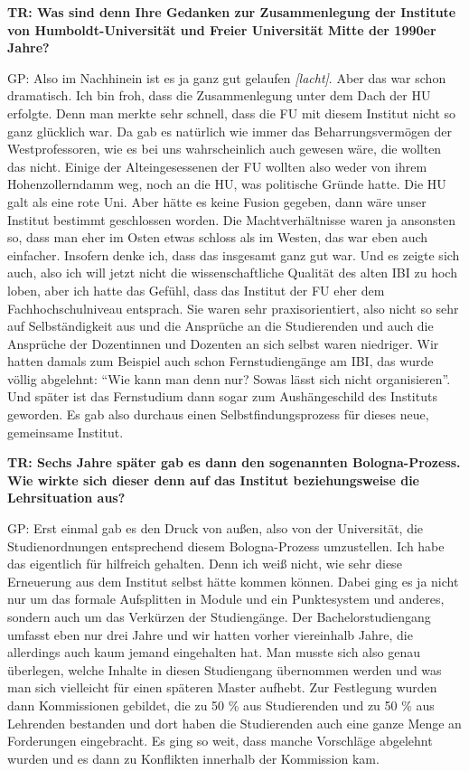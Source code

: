 \documentclass[a4paper,
fontsize=11pt,
oneside,
numbers=noperiodatend,
parskip=half-,
bibliography=totoc,
final
]{scrartcl}
\begin{document}
\textbf{TR: Was sind denn Ihre Gedanken zur Zusammenlegung der Institute
von Humboldt-Universität und Freier Universität Mitte der 1990er Jahre?}

GP: Also im Nachhinein ist es ja ganz gut gelaufen \emph{{[}lacht{]}}.
Aber das war schon dramatisch. Ich bin froh, dass die Zusammenlegung
unter dem Dach der HU erfolgte. Denn man merkte sehr schnell, dass die
FU mit diesem Institut nicht so ganz glücklich war. Da gab es natürlich
wie immer das Beharrungsvermögen der Westprofessoren, wie es bei uns
wahrscheinlich auch gewesen wäre, die wollten das nicht. Einige der
Alteingesessenen der FU wollten also weder von ihrem Hohenzollerndamm
weg, noch an die HU, was politische Gründe hatte. Die HU galt als eine
rote Uni. Aber hätte es keine Fusion gegeben, dann wäre unser Institut
bestimmt geschlossen worden. Die Machtverhältnisse waren ja ansonsten
so, dass man eher im Osten etwas schloss als im Westen, das war eben
auch einfacher. Insofern denke ich, dass das insgesamt ganz gut war. Und
es zeigte sich auch, also ich will jetzt nicht die wissenschaftliche
Qualität des alten IBI zu hoch loben, aber ich hatte das Gefühl, dass
das Institut der FU eher dem Fachhochschulniveau entsprach. Sie waren
sehr praxisorientiert, also nicht so sehr auf Selbständigkeit aus und
die Ansprüche an die Studierenden und auch die Ansprüche der Dozentinnen
und Dozenten an sich selbst waren niedriger. Wir hatten damals zum
Beispiel auch schon Fernstudiengänge am IBI, das wurde völlig abgelehnt:
\enquote{Wie kann man denn nur? Sowas lässt sich nicht organisieren}.
Und später ist das Fernstudium dann sogar zum Aushängeschild des
Instituts geworden. Es gab also durchaus einen Selbstfindungsprozess für
dieses neue, gemeinsame Institut.

\textbf{TR: Sechs Jahre später gab es dann den sogenannten
Bologna-Prozess. Wie wirkte sich dieser denn auf das Institut
beziehungsweise die Lehrsituation aus?}

GP: Erst einmal gab es den Druck von außen, also von der Universität,
die Studienordnungen entsprechend diesem Bologna-Prozess umzustellen.
Ich habe das eigentlich für hilfreich gehalten. Denn ich weiß nicht, wie
sehr diese Erneuerung aus dem Institut selbst hätte kommen können. Dabei
ging es ja nicht nur um das formale Aufsplitten in Module und ein
Punktesystem und anderes, sondern auch um das Verkürzen der
Studiengänge. Der Bachelorstudiengang umfasst eben nur drei Jahre und
wir hatten vorher viereinhalb Jahre, die allerdings auch kaum jemand
eingehalten hat. Man musste sich also genau überlegen, welche Inhalte in
diesen Studiengang übernommen werden und was man sich vielleicht für
einen späteren Master aufhebt. Zur Festlegung wurden dann Kommissionen
gebildet, die zu 50 \% aus Studierenden und zu 50 \% aus Lehrenden
bestanden und dort haben die Studierenden auch eine ganze Menge an
Forderungen eingebracht. Es ging so weit, dass manche Vorschläge
abgelehnt wurden und es dann zu Konflikten innerhalb der Kommission kam.
\end{document}
